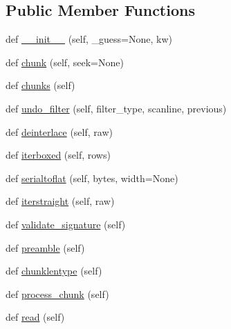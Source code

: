 \subsection*{Public Member Functions}
\begin{DoxyCompactItemize}
\item 
def \hyperlink{classpygame_1_1tests_1_1test__utils_1_1png_1_1_reader_ab9cd49130182e4cef3165c9624808ac4}{\+\_\+\+\_\+init\+\_\+\+\_\+} (self, \+\_\+guess=None, kw)
\item 
def \hyperlink{classpygame_1_1tests_1_1test__utils_1_1png_1_1_reader_a58578fa84d6cfec63de66cd3eac7db3c}{chunk} (self, seek=None)
\item 
def \hyperlink{classpygame_1_1tests_1_1test__utils_1_1png_1_1_reader_aa3f8b0fd5a7557c049ee0718f33b9def}{chunks} (self)
\item 
def \hyperlink{classpygame_1_1tests_1_1test__utils_1_1png_1_1_reader_ae3ed79bc9eea16f435d70da9acb41390}{undo\+\_\+filter} (self, filter\+\_\+type, scanline, previous)
\item 
def \hyperlink{classpygame_1_1tests_1_1test__utils_1_1png_1_1_reader_a6918a60b5484ac0742bfff1e883c8151}{deinterlace} (self, raw)
\item 
def \hyperlink{classpygame_1_1tests_1_1test__utils_1_1png_1_1_reader_a848bf0db133eac64b60d8b23f8f9fced}{iterboxed} (self, rows)
\item 
def \hyperlink{classpygame_1_1tests_1_1test__utils_1_1png_1_1_reader_a3acdf9b3eccaa75e390e286af906f666}{serialtoflat} (self, bytes, width=None)
\item 
def \hyperlink{classpygame_1_1tests_1_1test__utils_1_1png_1_1_reader_a9753fc5d779635c9180fac77b4b1c578}{iterstraight} (self, raw)
\item 
def \hyperlink{classpygame_1_1tests_1_1test__utils_1_1png_1_1_reader_a95c0b314ab562685959942ca345d2621}{validate\+\_\+signature} (self)
\item 
def \hyperlink{classpygame_1_1tests_1_1test__utils_1_1png_1_1_reader_a0eaa36df8274855df52028321fe2d945}{preamble} (self)
\item 
def \hyperlink{classpygame_1_1tests_1_1test__utils_1_1png_1_1_reader_a258982ed268ed154b7522191c94cfe7e}{chunklentype} (self)
\item 
def \hyperlink{classpygame_1_1tests_1_1test__utils_1_1png_1_1_reader_af4c692e0d7c3c40c6597b9c948eefadc}{process\+\_\+chunk} (self)
\item 
def \hyperlink{classpygame_1_1tests_1_1test__utils_1_1png_1_1_reader_a00fe12c1b3ea423069ce36dee85943d8}{read} (self)

\end{DoxyCompactItemize}
